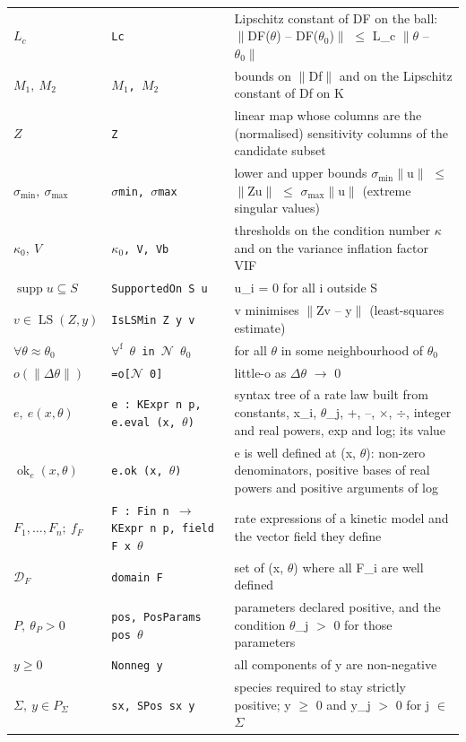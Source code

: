 {\begin{longtable}{@{}>{\raggedright\arraybackslash}p{4.0cm}>{\raggedright\arraybackslash}p{4.6cm}>{\raggedright\arraybackslash}p{7.2cm}@{}}
$L_c$ & \texttt{Lc} & Lipschitz constant of DF on the ball: $\|$DF($\theta$) -- DF($\theta_0$)$\|$ $\le$ L\_c $\|\theta$ -- $\theta_0\|$ \\
$M_1,\ M_2$ & \texttt{$M_1$, $M_2$} & bounds on $\|$Df$\|$ and on the Lipschitz constant of Df on K \\
$Z$ & \texttt{Z} & linear map whose columns are the (normalised) sensitivity columns of the candidate subset \\
$\sigma_{\min},\ \sigma_{\max}$ & \texttt{$\sigma$min, $\sigma$max} & lower and upper bounds $\sigma_{\min}\|$u$\|$ $\le$ $\|$Zu$\|$ $\le$ $\sigma_{\max}\|$u$\|$ (extreme singular values) \\
$\kappa_0,\ V$ & \texttt{$\kappa_0$, V, Vb} & thresholds on the condition number $\kappa$ and on the variance inflation factor VIF \\
$\operatorname{supp}u\subseteq S$ & \texttt{SupportedOn S u} & u\_i = 0 for all i outside S \\
$v\in\operatorname{LS}(Z,y)$ & \texttt{IsLSMin Z y v} & v minimises $\|$Zv -- y$\|$ (least-squares estimate) \\
$\forall\theta\approx\theta_0$ & \texttt{$\forall^{\mathrm f}$ $\theta$ in $\mathcal N$ $\theta_0$} & for all $\theta$ in some neighbourhood of $\theta_0$ \\
$o(\|\Delta\theta\|)$ & \texttt{=o[$\mathcal N$ 0]} & little-o as $\Delta\theta$ $\to$ 0 \\
$e,\ e(x,\theta)$ & \texttt{e : KExpr n p, e.eval (x, $\theta$)} & syntax tree of a rate law built from constants, x\_i, $\theta$\_j, +, --, $\times$, $\div$, integer and real powers, exp and log; its value \\
$\operatorname{ok}_e(x,\theta)$ & \texttt{e.ok (x, $\theta$)} & e is well defined at (x, $\theta$): non-zero denominators, positive bases of real powers and positive arguments of log \\
$F_1,\dots,F_n;\ f_F$ & \texttt{F : Fin n $\to$ KExpr n p, field F x $\theta$} & rate expressions of a kinetic model and the vector field they define \\
$\mathcal{D}_F$ & \texttt{domain F} & set of (x, $\theta$) where all F\_i are well defined \\
$P,\ \theta_P>0$ & \texttt{pos, PosParams pos $\theta$} & parameters declared positive, and the condition $\theta$\_j $>$ 0 for those parameters \\
$y\ge 0$ & \texttt{Nonneg y} & all components of y are non-negative \\
$\Sigma,\ y\in P_\Sigma$ & \texttt{sx, SPos sx y} & species required to stay strictly positive; y $\ge$ 0 and y\_j $>$ 0 for j $\in$ $\Sigma$ \\

\end{longtable}}
